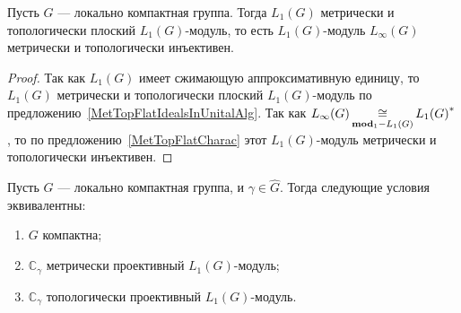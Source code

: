 \begin{proposition}\label{LInfIsL1MetrInj} Пусть $G$ --- локально компактная
группа. Тогда $L_1(G)$ метрически и топологически плоский $L_1(G)$-модуль, то
есть $L_1(G)$-модуль $L_\infty(G)$ метрически и топологически инъективен.
\end{proposition} 
\begin{proof} Так как $L_1(G)$ имеет сжимающую аппроксимативную единицу, то
$L_1(G)$ метрически и топологически плоский $L_1(G)$-модуль по
предложению~\ref{MetTopFlatIdealsInUnitalAlg}. Так как
$L_\infty(G)\mathop{\mathbin{\cong}}\limits_{\mathbf{mod}_1-L_1(G)}{L_1(G)}^*$, то по
предложению~\ref{MetTopFlatCharac} этот $L_1(G)$-модуль метрически и
топологически инъективен.
\end{proof}

\begin{proposition}\label{OneDimL1ModMetTopProjCharac} Пусть $G$ --- локально
компактная группа, и $\gamma\in\widehat{G}$. Тогда следующие условия
эквивалентны: 

\begin{enumerate}[label = (\roman*)]
    \item $G$ компактна;

    \item $\mathbb{C}_\gamma$ метрически проективный $L_1(G)$-модуль;

    \item $\mathbb{C}_\gamma$ топологически проективный $L_1(G)$-модуль.
\end{enumerate}
\end{proposition}
